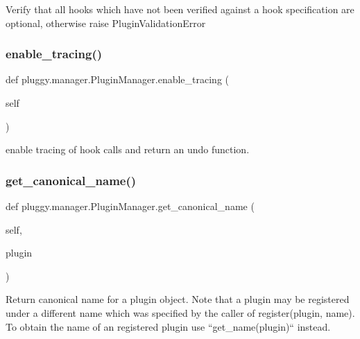 \begin{DoxyVerb}Verify that all hooks which have not been verified against
a hook specification are optional, otherwise raise PluginValidationError\end{DoxyVerb}
 \mbox{\label{classpluggy_1_1manager_1_1_plugin_manager_ad04e0ea4995ca3f7aa7b835cb888faeb}} 
\subsubsection{\texorpdfstring{enable\+\_\+tracing()}{enable\_tracing()}}
{\footnotesize\ttfamily def pluggy.\+manager.\+Plugin\+Manager.\+enable\+\_\+tracing (\begin{DoxyParamCaption}\item[{}]{self }\end{DoxyParamCaption})}

\begin{DoxyVerb}enable tracing of hook calls and return an undo function. \end{DoxyVerb}
 \mbox{\label{classpluggy_1_1manager_1_1_plugin_manager_a362f59ef5ac6d91a00891a23dc51af6a}} 
\subsubsection{\texorpdfstring{get\+\_\+canonical\+\_\+name()}{get\_canonical\_name()}}
{\footnotesize\ttfamily def pluggy.\+manager.\+Plugin\+Manager.\+get\+\_\+canonical\+\_\+name (\begin{DoxyParamCaption}\item[{}]{self,  }\item[{}]{plugin }\end{DoxyParamCaption})}

\begin{DoxyVerb}Return canonical name for a plugin object. Note that a plugin
may be registered under a different name which was specified
by the caller of register(plugin, name). To obtain the name
of an registered plugin use ``get_name(plugin)`` instead.\end{DoxyVerb}
 \mbox{\label{classpluggy_1_1manager_1_1_plugin_manager_a4a86b09e4c58368f6f0917fac70d439a}} 
